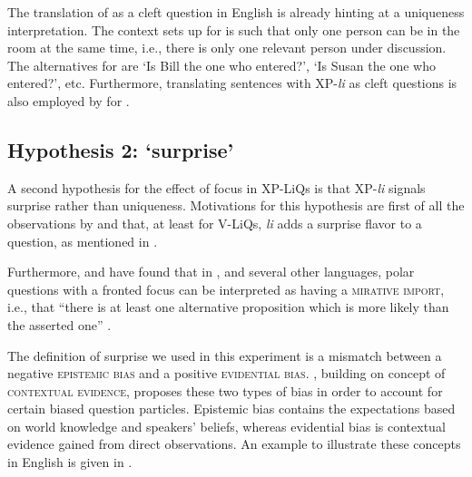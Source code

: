 \documentclass[output=paper,
colorlinks,
citecolor=brown,
newtxmath
]{langscibook}
\begin{document}
\noindent
The translation of  as a cleft question in English is already hinting at a uniqueness interpretation. The context \citet{dukova2010} sets up for  is such that only one person can be in the room at the same time, i.e., there is only one relevant person under discussion. The alternatives for  are `Is Bill the one who entered?', `Is Susan the one who entered?', etc. Furthermore, translating sentences with XP-\textit{li} as cleft questions is also employed by \citet{king1994} for .



\subsection{Hypothesis 2: `surprise'}\label{sec:surprise}
A second hypothesis for the effect of focus in XP-LiQs is that XP-\textit{li} signals surprise rather than uniqueness. Motivations for this hypothesis are first of all the observations by \citet{Rudin.Kramer.Billings.Baerman1999} and \citet{lazarova2003} that, at least for V-LiQs, \textit{li} adds a surprise flavor to a question, as mentioned in .


Furthermore, \citet{bianchi.cruschina2016} and \citet{bianchi.bocci.cruschina2016} have found that in , and several other languages, polar questions with a fronted focus can be interpreted as having a \textsc{mirative import}, i.e., that ``there is at least one alternative proposition which is more likely than the asserted one'' \citep[60]{bianchi.cruschina2016}.

The definition of surprise we used in this experiment is a mismatch between a negative \textsc{epistemic bias}  and a positive \textsc{evidential bias}. \cite{sudo2013}, building on  concept of \textsc{contextual evidence}, proposes these two types of bias in order to account for certain  biased question particles.
Epistemic bias contains the expectations based on world knowledge and speakers' beliefs, whereas evidential bias is contextual evidence gained from direct observations. An example to illustrate these concepts in English is given in .
\end{document}
